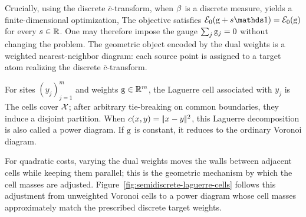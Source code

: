Crucially, using the discrete $\bar c$-transform, when $\beta$ is a discrete measure, yields a finite-dimensional optimization,
The objective satisfies $\Ee_0(\gD+s\ones)=\Ee_0(\gD)$ for every $s\in\mathbb{R}$. One may therefore impose the gauge $\sum_j\mathrm{g}_j=0$ without changing the problem. The geometric object encoded by the dual weights is a weighted nearest-neighbor diagram: each source point is assigned to a target atom realizing the discrete $\bar c$-transform.

\begin{defn}\label{def-laguerre-power-cells}
	For sites $(y_j)_{j=1}^m$ and weights $\mathrm{g}\in\mathbb{R}^m$, the Laguerre cell associated with $y_j$ is
	The cells cover $\mathcal{X}$; after arbitrary tie-breaking on common boundaries, they induce a disjoint partition. When $c(x,y)=|\!| x-y |\!|^2$, this Laguerre decomposition is also called a power diagram. If $\mathrm{g}$ is constant, it reduces to the ordinary Voronoi diagram.
\end{defn}
For quadratic costs, varying the dual weights moves the walls between adjacent cells while keeping them parallel; this is the geometric mechanism by which the cell masses are adjusted.
%
Figure~\ref{fig:semidiscrete-laguerre-cells} follows this adjustment from unweighted Voronoi cells to a power diagram whose cell masses approximately match the prescribed discrete target weights.

